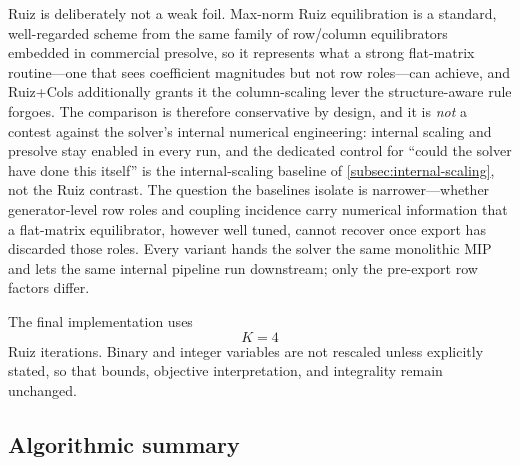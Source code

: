 \documentclass[AMA,Times1COL]{WileyNJDv5} %
\newcommand{\methodRuiz}{Ruiz}
\newcommand{\methodRuizCols}{Ruiz+Cols}
\providecommand{\DIFadd}[1]{{\protect\color{blue} \sf #1}} %
\providecommand{\DIFaddbegin}{} %
\providecommand{\DIFaddend}{} %
\begin{document}
\DIFaddbegin \DIFadd{\methodRuiz{} is deliberately not a weak foil. Max-norm Ruiz equilibration is a standard,
well-regarded scheme from the same family of row/column equilibrators embedded in commercial
presolve, so it represents what a strong flat-matrix routine---one that sees coefficient
magnitudes but not row roles---can achieve, and \methodRuizCols{} additionally grants it the
column-scaling lever the structure-aware rule forgoes. The comparison is therefore conservative
by design, and it is \emph{not} a contest against the solver's internal numerical engineering:
internal scaling and presolve stay enabled in every run, and the dedicated control for ``could
the solver have done this itself'' is the internal-scaling baseline of
\cref{subsec:internal-scaling}, not the Ruiz contrast. The question the baselines isolate is
narrower---whether generator-level row roles and coupling incidence carry numerical information
that a flat-matrix equilibrator, however well tuned, cannot recover once export has discarded
those roles. Every variant hands the solver the same monolithic MIP and lets the same internal
pipeline run downstream; only the pre-export row factors differ.
}

\DIFaddend The final implementation uses
\begin{equation}
K=4
\end{equation}
Ruiz iterations. Binary and integer variables are not rescaled unless explicitly stated,
so that bounds, objective interpretation, and integrality remain unchanged.

\subsection{Algorithmic summary}
\end{document}
